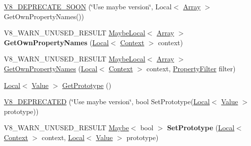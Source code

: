 \begin{DoxyCompactItemize}
\item 
\hyperlink{classv8_1_1_object_aa72e9d0d22d1d4a4c4b63827a5469d40}{V8\+\_\+\+D\+E\+P\+R\+E\+C\+A\+T\+E\+\_\+\+S\+O\+ON} (\char`\"{}Use maybe version\char`\"{}, Local$<$ \hyperlink{classv8_1_1_array}{Array} $>$ Get\+Own\+Property\+Names())
\item 
V8\+\_\+\+W\+A\+R\+N\+\_\+\+U\+N\+U\+S\+E\+D\+\_\+\+R\+E\+S\+U\+LT \hyperlink{classv8_1_1_maybe_local}{Maybe\+Local}$<$ \hyperlink{classv8_1_1_array}{Array} $>$ {\bfseries Get\+Own\+Property\+Names} (\hyperlink{classv8_1_1_local}{Local}$<$ \hyperlink{classv8_1_1_context}{Context} $>$ context)\hypertarget{classv8_1_1_object_ab4f1fc692a02c11d749a7d5120e67026}{}\label{classv8_1_1_object_ab4f1fc692a02c11d749a7d5120e67026}

\item 
V8\+\_\+\+W\+A\+R\+N\+\_\+\+U\+N\+U\+S\+E\+D\+\_\+\+R\+E\+S\+U\+LT \hyperlink{classv8_1_1_maybe_local}{Maybe\+Local}$<$ \hyperlink{classv8_1_1_array}{Array} $>$ \hyperlink{classv8_1_1_object_a1e6301a45e98e6d6d80e98a148a9f181}{Get\+Own\+Property\+Names} (\hyperlink{classv8_1_1_local}{Local}$<$ \hyperlink{classv8_1_1_context}{Context} $>$ context, \hyperlink{namespacev8_afbf02b6b1152a3e25d7bde90798209ac}{Property\+Filter} filter)
\item 
\hyperlink{classv8_1_1_local}{Local}$<$ \hyperlink{classv8_1_1_value}{Value} $>$ \hyperlink{classv8_1_1_object_ae8d3fed7d6dbd667c29cabb3039fe7af}{Get\+Prototype} ()
\item 
\hyperlink{classv8_1_1_object_a4ce54e137e22eddbe2857a15a20219b2}{V8\+\_\+\+D\+E\+P\+R\+E\+C\+A\+T\+ED} (\char`\"{}Use maybe version\char`\"{}, bool Set\+Prototype(\hyperlink{classv8_1_1_local}{Local}$<$ \hyperlink{classv8_1_1_value}{Value} $>$ prototype))
\item 
V8\+\_\+\+W\+A\+R\+N\+\_\+\+U\+N\+U\+S\+E\+D\+\_\+\+R\+E\+S\+U\+LT \hyperlink{classv8_1_1_maybe}{Maybe}$<$ bool $>$ {\bfseries Set\+Prototype} (\hyperlink{classv8_1_1_local}{Local}$<$ \hyperlink{classv8_1_1_context}{Context} $>$ context, \hyperlink{classv8_1_1_local}{Local}$<$ \hyperlink{classv8_1_1_value}{Value} $>$ prototype)\hypertarget{classv8_1_1_object_a1f1fc25d2a440ad2a8b7d94db04f88fb}{}\label{classv8_1_1_object_a1f1fc25d2a440ad2a8b7d94db04f88fb}


\end{DoxyCompactItemize}

